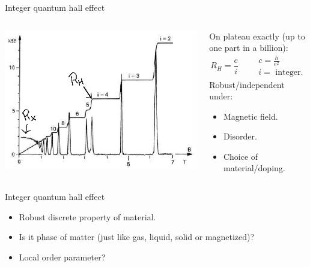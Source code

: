 \documentclass{beamer}
\begin{document}
\begin{frame}{Integer quantum hall effect}
	\begin{columns}
		\begin{column}{0.7\textwidth}
			\begin{center}
				\includegraphics[width=\textwidth]{Images/IntegerQHE.png}
			\end{center}
		\end{column}
		\begin{column}{0.3\textwidth}
			On plateau exactly (up to one part in a billion):
			\[R_H=\frac{c}{i}\qquad \begin{matrix}
			c=\frac{h}{e^2}\\i=\text{ integer.}
			\end{matrix}\]
			\pause
			Robust/independent under:
			\begin{itemize}
				\item Magnetic field.
				\item Disorder.
				\item Choice of material/doping.
			\end{itemize}
		\end{column}
	\end{columns}
\end{frame}

\begin{frame}{Integer quantum hall effect}
	\begin{itemize}
		\item Robust discrete property of material.
		\pause
		\item Is it phase of matter (just like gas, liquid, solid or magnetized)?
		\pause
		\item
		Local order parameter?
	\end{itemize}
\end{frame}
\end{document}
